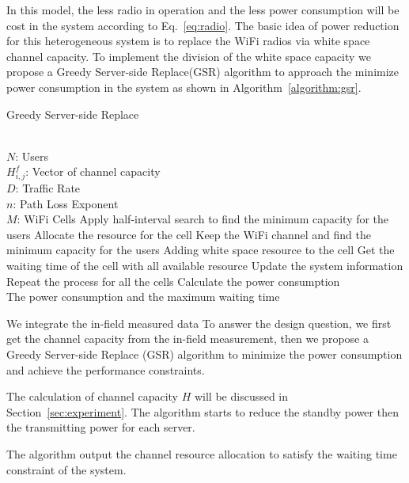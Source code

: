 In this model, the less radio in operation and the less power consumption will be cost in the system according to 
Eq.~\ref{eq:radio}. 
The basic idea of power reduction for this heterogeneous system is to replace the WiFi radios via white space channel 
capacity. To implement the division of the white space capacity we propose a Greedy Server-side Replace(GSR) algorithm 
to approach the minimize power consumption in the system as shown in Algorithm~\ref{algorithm:gsr}. 

\begin{algorithm}[t]
\small
\caption{Greedy Server-side Replace}
\label{algorithm:gsr}
\begin{algorithmic}[1]
\REQUIRE  ~~\\
$N$: Users\\
$H_{i,j}^f$: Vector of channel capacity\\
$D$: Traffic Rate\\
$n$: Path Loss Exponent \\
$M$: WiFi Cells
\STATE Apply half-interval search to find the minimum capacity for the users
\STATE Allocate the resource for the cell
\STATE Keep the WiFi channel and find the minimum capacity for the users
\STATE Adding white space resource to the cell
\ENDIF
\ELSE 
\STATE Get the waiting time of the cell with all available resource
\ENDIF
\STATE Update the system information
\STATE Repeat the process for all the cells
\STATE Calculate the power consumption
\ENSURE ~~\\
The power consumption and the maximum waiting time\\
\end{algorithmic}
\end{algorithm}


We integrate the in-field measured data To answer the design question, we first get the channel capacity from the in-field measurement, then we 
propose a Greedy Server-side Replace (GSR) algorithm to minimize the power consumption and achieve the 
performance constraints.




The calculation of channel capacity $H$ will be discussed in Section~\ref{sec:experiment}.
The algorithm starts to reduce the standby power then the transmitting power for each server.





The algorithm output the channel resource allocation to satisfy the waiting 
time constraint of the system.



